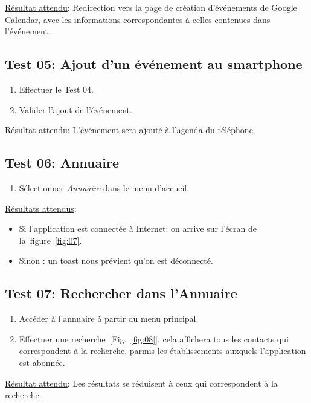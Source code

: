\documentclass [pdftex,12pt] {report}
\begin{document}
    \underline{Résultat attendu}: Redirection vers la page de création d'événements de Google Calendar, avec les informations correspondantes à celles contenues dans l'événement.

  \subsection{Test 05: Ajout d'un événement au smartphone}
    \begin{enumerate}
    \item Effectuer le Test 04.
    \item Valider l'ajout de l'événement.
    \end{enumerate}

    \underline{Résultat attendu}: L'événement sera ajouté à l'agenda du téléphone.


  \subsection{Test 06: Annuaire}
    \begin{enumerate}
    \item Sélectionner \emph{Annuaire} dans le menu d'accueil.
    \end{enumerate}

    \underline{Résultats attendus}:
    \begin{itemize}
    \item Si l'application est connectée à Internet: on arrive sur l'écran de la~figure~\ref{fig:07}.
    \item Sinon : un toast nous prévient qu'on est déconnecté.
    \end{itemize}

  \subsection{Test 07: Rechercher dans l'Annuaire}
    \begin{enumerate}
    \item Accéder à l'annuaire à partir du menu principal.
    \item Effectuer une recherche~[Fig.~\ref{fig:08}], cela affichera tous les contacts qui correspondent à la recherche, parmis les établissements auxquels l'application est abonnée.
    \end{enumerate}

    \underline{Résultat attendu}: Les résultats se réduisent à ceux qui correspondent à la recherche.
\end{document}

